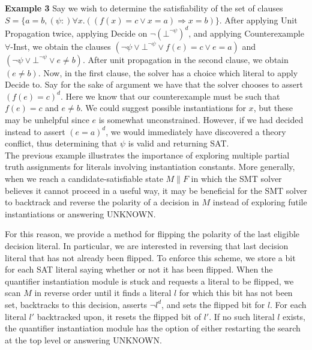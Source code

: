 \documentclass{llncs}
\begin{document}
{\bf Example 3} 
Say we wish to determine the satisfiability of the set of clauses $S = \{ a = b, (\psi :) \forall x. ((f(x) = c \vee x = a) \Rightarrow x = b) \}$.
After applying Unit Propagation twice, applying Decide on $\neg (\bot^{ \neg \psi })^d$, and applying Counterexample $\forall$-Inst, we obtain the clauses $( \neg \psi \vee \bot^{ \neg \psi } \vee f(e) = c \vee e = a )$ and $( \neg \psi \vee \bot^{ \neg \psi } \vee e \neq b )$.
After unit propagation in the second clause, we obtain $( e \neq b )$.
Now, in the first clause, the solver has a choice which literal to apply Decide to.
Say for the sake of argument we have that the solver chooses to assert $( f(e) = c )^d$.
Here we know that our counterexample must be such that $f( e ) = c$ and $e \neq b$.
We could suggest possible instantiations for $x$, but these may be unhelpful since $e$ is somewhat unconstrained.
However, if we had decided instead to assert $( e = a )^d$, we would immediately have discovered a theory conflict, thus determining that $\psi$ is valid and returning SAT. \\

The previous example illustrates the importance of exploring multiple partial truth assignments for literals involving instantiation constants.
More generally, when we reach a candidate-satisfiable state $M \parallel F$ in which the SMT solver believes it cannot proceed in a useful way, it may be beneficial for the SMT solver to backtrack and reverse the polarity of a decision in $M$ instead of exploring futile instantiations or answering UNKNOWN.

For this reason, we provide a method for flipping the polarity of the last eligible decision literal.
In particular, we are interested in reversing that last decision literal that has not already been flipped.
To enforce this scheme, we store a bit for each SAT literal saying whether or not it has been flipped.
When the quantifier instantiation module is stuck and requests a literal to be flipped, we scan $M$ in reverse order until it finds a literal $l$ for which this bit has not been set, backtracks to this decision, asserts $\neg l^d$, and sets the flipped bit for $l$.
For each literal $l'$ backtracked upon, it resets the flipped bit of $l'$.
If no such literal $l$ exists, the quantifier instantiation module has the option of either restarting the search at the top level or answering UNKNOWN.

\begin{comment}
\section{Summary}

A method for handling quantifiers in SMT has been presented.
This method focuses on finding a satisifying assignment for the negated body of the quantifiers $\psi$, and uses this information to guide instanstiations.
This is possible through the use of lemmas containing a counterexample literals $\neg \bot^\psi$, which in addition act as a way of recognizing satisfiable instances in a straightforward way.
An ideal implementation of this approach requires three additional features from the SAT solver, all which can be enforced in a reasonable way.
\end{comment}
\end{document}

